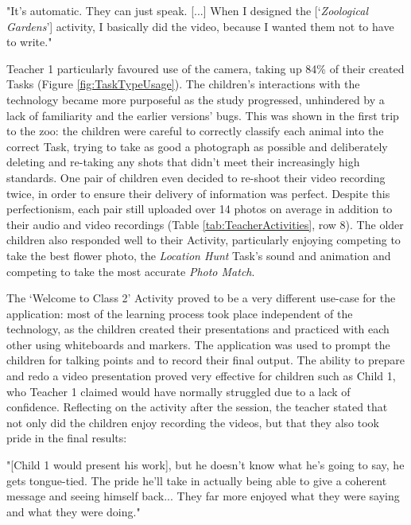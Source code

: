 \begin{displayquote}
"It’s automatic. They can just speak. [...] When I designed the [‘\textit{Zoological Gardens}’] activity, I basically did the video, because I wanted them not to have to write."
\end{displayquote}

Teacher 1 particularly favoured use of the camera, taking up 84\% of their created Tasks (Figure \ref{fig:TaskTypeUsage}). The children's interactions with the technology became more purposeful as the study progressed, unhindered by a lack of familiarity and the earlier versions' bugs. This was shown in the first trip to the zoo: the children were careful to correctly classify each animal into the correct Task, trying to take as good a photograph as possible and deliberately deleting and re-taking any shots that didn't meet their increasingly high standards. One pair of children even decided to re-shoot their video recording twice, in order to ensure their delivery of information was perfect. Despite this perfectionism, each pair still uploaded over 14 photos on average in addition to their audio and video recordings (Table \ref{tab:TeacherActivities}, row 8). The older children also responded well to their Activity, particularly enjoying competing to take the best flower photo, the \textit{Location Hunt} Task’s sound and animation and competing to take the most accurate \textit{Photo Match}.

The `Welcome to Class 2' Activity proved to be a very different use-case for the application: most of the learning process took place independent of the technology, as the children created their presentations and practiced with each other using whiteboards and markers. The application was used to prompt the children for talking points and to record their final output. The ability to prepare and redo a video presentation proved very effective for children such as Child 1, who Teacher 1 claimed would have normally struggled due to a lack of confidence. Reflecting on the activity after the session, the teacher stated that not only did the children enjoy recording the videos, but that they also took pride in the final results: 

\begin{displayquote}
"[Child 1 would present his work], but he doesn't know what he’s going to say, he gets tongue-tied. The pride he’ll take in actually being able to give a coherent message and seeing himself back... They far more enjoyed what they were saying and what they were doing."
\end{displayquote}

